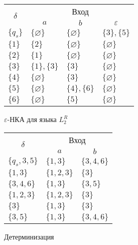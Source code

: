 \begin{enumerate}[label=(\roman{*})]
\begin{figure}[H]
\centering
\begin{subfigure}[b]{.6\linewidth}
\centering
	\begin{center}
		\begin{tabular}{llll}
			\toprule
			\multicolumn{1}{c}{\multirow{2}{*}{\Large $\delta$}}
			& \multicolumn{3}{c}{Вход} \\
			\cmidrule(rl){2-4}
			& \multicolumn{1}{c}{$a$}
			& \multicolumn{1}{c}{$b$} 
			& \multicolumn{1}{c}{$\varepsilon$} \\
			\midrule
			$\{q_s\}$       & $\{\varnothing\}$      		 & $\{\varnothing\}$     &$\{3\}, \{5\}$  \\
			$\{1\}$       & $\{2\}$    			 & $\{\varnothing\}$     &$\{\varnothing\}$ \\
			$\{2\}$       & $\{1\}$    			 & $\{\varnothing\}$     &$\{\varnothing\}$  \\
			$\{3\}$       & $\{1\}, \{3\}$    			 & $\{3\}$     &$\{\varnothing\}$  \\
			$\{4\}$       & $\{\varnothing\}$    			 & $\{3\}$     &$\{\varnothing\}$  \\
			$\{5\}$ 		& $\{\varnothing\}$    			 & $\{4\}, \{6\}$     &$\{\varnothing\}$  \\
			$\{6\}$       & $\{\varnothing\}$    	 & $\{5\}$     &$\{\varnothing\}$  \\
			\bottomrule
		\end{tabular}
	\end{center}
\caption{$\varepsilon$-НКА для языка $L_2^R$}\label{app-ex-task2-14}
\end{subfigure}%
%
\begin{subfigure}[b]{.4\linewidth}
\centering
		\begin{center}
		\begin{tabular}{lll}
			\toprule
			\multicolumn{1}{c}{\multirow{2}{*}{\Large $\delta$}}
			& \multicolumn{2}{c}{Вход} \\
			\cmidrule(rl){2-3}
			& \multicolumn{1}{c}{$a$}
			& \multicolumn{1}{c}{$b$}  \\
			\midrule
			$\{q_s, 3, 5\}$       & $\{1, 3\}$      		 & $\{3, 4, 6\}$ \\
			$\{1, 3\}$       & $\{1, 2, 3\}$    			 & $\{3\}$    \\
			$\{3, 4, 6\}$       & $\{1, 3\}$    			 & $\{3, 5\}$     \\
			$\{1, 2, 3\}$       & $\{1, 2, 3\}$    			 & $\{3\}$     \\
			$\{3\}$       & $\{1, 3\}$    			 & $\{3\}$     \\
			$\{3, 5\}$       & $\{1, 3\}$    	 & $\{3, 4, 6\}$   \\
			\bottomrule
		\end{tabular}
	\end{center}
\caption{Детерминизация}\label{app-ex-task2-13}
\end{subfigure}
\caption{}\label{app-ex-task2-15}
\end{figure}


\end{enumerate}
